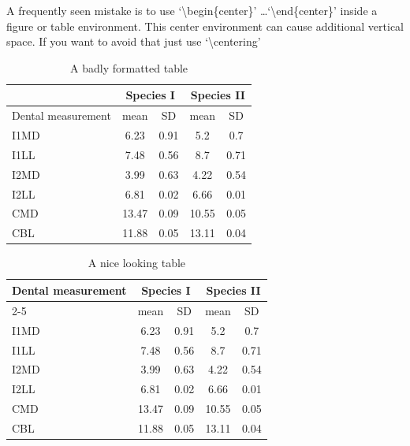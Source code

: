 A frequently seen mistake is to use `\textbackslash begin\{center\}' \dots `\textbackslash end\{center\}' inside a figure or table environment. This center environment can cause additional vertical space. If you want to avoid that just use `\textbackslash centering'


\begin{table}
\caption{A badly formatted table}
\centering
\label{table:bad_table}
\begin{tabular}{|l|c|c|c|c|}
\hline 
& \multicolumn{2}{c}{Species I} & \multicolumn{2}{c|}{Species II} \\ 
\hline
Dental measurement  & mean & SD  & mean & SD  \\ \hline 
\hline
I1MD & 6.23 & 0.91 & 5.2  & 0.7  \\
\hline 
I1LL & 7.48 & 0.56 & 8.7  & 0.71 \\
\hline 
I2MD & 3.99 & 0.63 & 4.22 & 0.54 \\
\hline 
I2LL & 6.81 & 0.02 & 6.66 & 0.01 \\
\hline 
CMD & 13.47 & 0.09 & 10.55 & 0.05 \\
\hline 
CBL & 11.88 & 0.05 & 13.11 & 0.04\\ 
\hline 
\end{tabular}
\end{table}

\begin{table}
\caption{A nice looking table}
\centering
\label{table:nice_table}
\begin{tabular}{l c c c c}
\hline 
\multirow{2}{*}{Dental measurement} & \multicolumn{2}{c}{Species I} & \multicolumn{2}{c}{Species II} \\ 
\cline{2-5}
  & mean & SD  & mean & SD  \\ 
\hline
I1MD & 6.23 & 0.91 & 5.2  & 0.7  \\

I1LL & 7.48 & 0.56 & 8.7  & 0.71 \\

I2MD & 3.99 & 0.63 & 4.22 & 0.54 \\

I2LL & 6.81 & 0.02 & 6.66 & 0.01 \\

CMD & 13.47 & 0.09 & 10.55 & 0.05 \\

CBL & 11.88 & 0.05 & 13.11 & 0.04\\ 
\hline 
\end{tabular}
\end{table}


